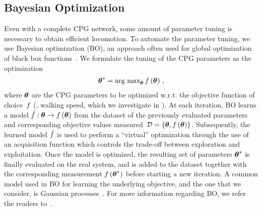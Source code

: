 \subsection{Bayesian Optimization}
\label{sec:bg:BO}
	Even with a complete CPG network, some amount of parameter tuning is necessary to obtain efficient locomotion. 
	To automate the parameter tuning, we use Bayesian optimization (BO), an approach often used for global optimization of black box functions~\citep{Kushner1964,Jones2001,Calandra2015a}.
	We formulate the tuning of the CPG parameters as the optimization
	\begin{align}
		\boldsymbol{\theta}^* = \text{arg max}_{\boldsymbol{\theta}}\, f\left(\boldsymbol{\theta}\right)\,,
		\label{eq:optimization}
	\end{align}
	where $\boldsymbol{\theta}$ are the CPG parameters to be optimized w.r.t. the objective function of choice~$f$ (\eg, walking speed, which we investigate in ).
	At each iteration, BO learns a model $\tilde{f}: \boldsymbol{\theta} \rightarrow f\left(\boldsymbol{\theta}\right)$ from the dataset of the previously evaluated parameters and corresponding objective values measured~$\mathcal{D}=\{\boldsymbol{\theta}, f\left(\boldsymbol{\theta}\right)\}$.
	Subsequently, the learned model $\tilde{f}$ is used to perform a ``virtual'' optimization through the use of an acquisition function which controls the trade-off between exploration and exploitation.
	Once the model is optimized, the resulting set of parameters $\boldsymbol{\theta}^*$ is finally evaluated on the real system, and is added to the dataset together with the corresponding measurement $f\left(\boldsymbol{\theta}^*\right)$  before starting a new iteration.
	A common model used in BO for learning the underlying objective, and the one that we consider, is Gaussian processes~\citep{Rasmussen2006}. 
	For more information regarding BO, we refer the readers to~\citep{Jones2001,Shahriari2016}.

	
